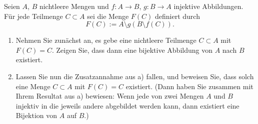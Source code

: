 \documentclass{../problemset}
\begin{document}
\begin{problem}
Seien $A$, $B$ nichtleere Mengen und $f : A \to B$, $g : B \to A$ injektive Abbildungen. Für jede Teilmenge $C \subset A$ sei die Menge $F(C)$ definiert durch
\[ F(C) := A \setminus g(B \setminus f(C)). \]

\begin{enumerate}
	\item Nehmen Sie zunächst an, es gebe eine nichtleere Teilmenge $C \subset A$ mit $F(C) = C$. Zeigen Sie, dass dann eine bijektive Abbildung von $A$ nach $B$ existiert.
	\item Lassen Sie nun die Zusatzannahme aus a) fallen, und beweisen Sie, dass solch eine Menge $C \subset A$ mit $F(C) = C$ existiert. (Dann haben Sie zusammen mit Ihrem Resultat aus a) bewiesen: Wenn jede von zwei Mengen $A$ und $B$ injektiv in die jeweils andere abgebildet werden kann, dann existiert eine Bijektion von $A$ auf $B$.)
\end{enumerate}
\end{problem}
\end{document}
